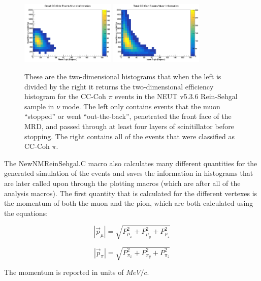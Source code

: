 \documentclass[11pt]{article}
\begin{document}
\begin{figure}[H]
\centering
\includegraphics[width=0.4\textwidth]{NewNMReinSehgalImages/6-GoodCCCohMuonInfoNMRS.png}
\includegraphics[width=0.4\textwidth]{NewNMReinSehgalImages/9-TotalCCCohMuonInfoNMRS.png}
\caption{These are the two-dimensional histograms that when the left is divided by the right it returns the two-dimensional efficiency histogram for the CC-Coh $\pi$ events in the NEUT v5.3.6 Rein-Sehgal sample in $\nu$ mode. The left only contains events that the muon ``stopped'' or went ``out-the-back'', penetrated the front face of the MRD, and passed through at least four layers of scinitillator before stopping. The right contains all of the events that were classified as CC-Coh $\pi$.}
\label{fig:app:NMCCCohMuon2DRS}
\end{figure}

The NewNMReinSehgal.C macro also calculates many different quantities for the generated simulation of the events and saves the information in histograms that are later called upon through the plotting macros (which are after all of the analysis macros). The first quantity that is calculated for the different vertexes is the momentum of both the muon and the pion, which are both calculated using the equations:

\begin{equation}
|\vec{p}_\mu| = \sqrt{P_{\mu_x}^2 + P_{\mu_y}^2 + P_{\mu_z}^2}
\end{equation}

\begin{equation}
|\vec{p}_\pi| = \sqrt{P_{\pi_x}^2 + P_{\pi_y}^2 + P_{\pi_z}^2}
\end{equation}

\noindent
The momentum is reported in units of $MeV/c$.
\end{document}

